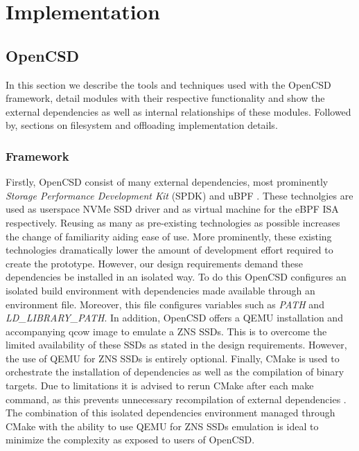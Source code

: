 
\chapter{Implementation} %



\ifpdf
    \graphicspath{{7/figures/PNG/}{7/figures/PDF/}{7/figures/}}
\else
    \graphicspath{{7/figures/EPS/}{7/figures/}}
\fi

\section{OpenCSD}

In this section we describe the tools and techniques used with the OpenCSD
framework, detail modules with their respective functionality and show the
external dependencies as well as internal relationships of these modules. 
Followed by, sections on filesystem and offloading implementation details.

\subsection{Framework}

Firstly, OpenCSD consist of many external dependencies, most prominently
\textit{Storage Performance Development Kit} (SPDK) \cite{spdk} and uBPF
\cite{ubpf}. These technolgies are used as userspace NVMe SSD driver and as
virtual machine for the eBPF ISA respectively. Reusing as many as pre-existing
technologies as possible increases the change of familiarity aiding ease of use.
More prominently, these existing technologies dramatically lower the amount of
development effort required to create the prototype. However, our design
requirements demand these dependencies be installed in an isolated way. To do
this OpenCSD configures an isolated build environment with dependencies made
available through an environment file. Moreover, this file configures variables
such as \textit{PATH} and \textit{LD\_LIBRARY\_PATH}. In addition, OpenCSD
offers a QEMU installation and accompanying qcow image to emulate a ZNS SSDs.
This is to overcome the limited availability of these SSDs as stated in the
design requirements. However, the use of QEMU for ZNS SSDs is entirely optional.
Finally, CMake \cite{cmake} is used to orchestrate the installation of
dependencies as well as the compilation of binary targets. Due to limitations it
is advised to rerun CMake after each make command, as this  prevents unnecessary
recompilation of external dependencies \footnotemark[9]. The combination of this
isolated dependencies environment managed through CMake with the ability to use
QEMU for ZNS SSDs emulation is ideal to minimize the complexity as exposed to
users of OpenCSD.

